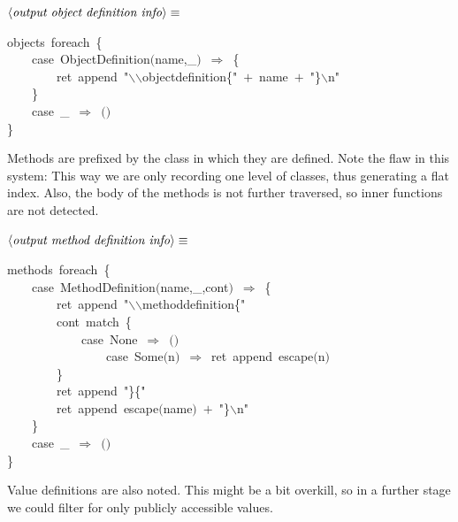 \documentclass[a4paper,12pt]{article}
\begin{document}
$\left<\mbox{\emph{output object definition info}}\right>\equiv$
\begin{program}objects~foreach~{\small\{}
\\~~~~{\vem case}~ObjectDefinition$($name,\_$)$~$\Rightarrow$~{\small\{}
\\~~~~~~~~ret~append~"$\backslash$$\backslash$objectdefinition{\small\{}"~$+$~name~$+$~"{\small\}}$\backslash$n"
\\~~~~{\small\}}
\\~~~~{\vem case}~\_~$\Rightarrow$~$($$)$
\\{\small\}}
\\[0.5em]\end{program}
Methods are prefixed by the class in which they are defined. Note
the flaw in this system: This way we are only recording one level
of classes, thus generating a flat index. Also, the body of the
methods is not further traversed, so inner functions are not
detected.

$\left<\mbox{\emph{output method definition info}}\right>\equiv$
\begin{program}methods~foreach~{\small\{}
\\~~~~{\vem case}~MethodDefinition$($name,\_,cont$)$~$\Rightarrow$~{\small\{}
\\~~~~~~~~ret~append~"$\backslash$$\backslash$methoddefinition{\small\{}"
\\~~~~~~~~cont~{\vem match}~{\small\{}
\\~~~~~~~~~~~~{\vem case}~None~$\Rightarrow$~$($$)$
\\~~~~~~~~~~~~~~~~{\vem case}~Some$($n$)$~$\Rightarrow$~ret~append~escape$($n$)$
\\~~~~~~~~{\small\}}
\\~~~~~~~~ret~append~"{\small\}}{\small\{}"
\\~~~~~~~~ret~append~escape$($name$)$~$+$~"{\small\}}$\backslash$n"
\\~~~~{\small\}}
\\~~~~{\vem case}~\_~$\Rightarrow$~$($$)$
\\{\small\}}
\\[0.5em]\end{program}
Value definitions are also noted. This might be a bit
overkill, so in a further stage we could filter for only
publicly accessible values.
\end{document}
